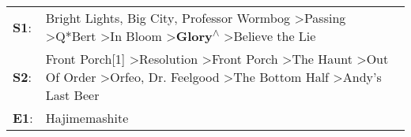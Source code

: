 \begin{supertabular}{p{0.03\textwidth}p{0.92\textwidth}}
 \textbf{S1}:  &                                                                                          Bright Lights, Big City\textsuperscript{}, \enspace Professor Wormbog\textsuperscript{} \textgreater \enspace Passing\textsuperscript{} \textgreater \enspace Q*Bert\textsuperscript{} \textgreater \enspace In Bloom\textsuperscript{} \textgreater \enspace \textbf{Glory\textsuperscript{$\wedge$}} \textgreater \enspace Believe the Lie\textsuperscript{}  \enspace  \\
 \textbf{S2}:  &  Front Porch[1]\textsuperscript{} \textgreater \enspace Resolution\textsuperscript{} \textgreater \enspace Front Porch\textsuperscript{} \textgreater \enspace The Haunt\textsuperscript{} \textgreater \enspace Out Of Order\textsuperscript{} \textgreater \enspace Orfeo\textsuperscript{}, \enspace Dr. Feelgood\textsuperscript{} \textgreater \enspace The Bottom Half\textsuperscript{} \textgreater \enspace Andy's Last Beer\textsuperscript{}  \enspace  \\
 \textbf{E1}:  &                                                                                                                                                                                                                                                                                                                                                                                                                         Hajimemashite\textsuperscript{}  \enspace  \\
\end{supertabular}
